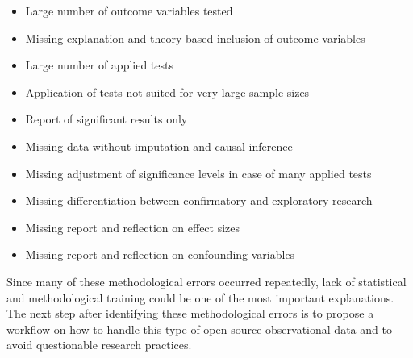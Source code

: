 \begin{itemize}
    \item Large number of outcome variables tested  \cite{bjorklund2022balancing,le2022visual,ortega2021effect,franchini2020tracking}
    \item Missing explanation and theory-based inclusion of outcome variables \cite{bjorklund2022balancing,le2022visual,koenigsberg2020generational,de2022relative}
    \item Large number of applied tests \cite{bjorklund2022balancing,le2022visual,ortega2021effect,koenigsberg2020generational,zart2022season,de2022relative,fuller2020ten,franchini2020tracking,nikolaidis2019russians}
    \item Application of tests not suited for very large sample sizes \cite{herold2022off,ortega2021effect,hackett2021effects,koenigsberg2020generational,mcintosh2021apples,de2022relative,jackson2020hill}
    \item Report of significant results only \cite{le2022visual,hackett2021effects,fuller2020ten,nikolaidis2019russians}
    \item Missing data without imputation and causal inference \cite{le2022visual,de2022relative}
    \item Missing adjustment of significance levels in case of many applied tests \cite{bjorklund2022balancing,herold2022off,le2022visual,ortega2021effect,hackett2021effects,koenigsberg2020generational,zart2022season,franchini2020tracking,jackson2020hill,nikolaidis2019russians}
    \item Missing differentiation between confirmatory and exploratory research \cite{bjorklund2022balancing,le2022visual,ortega2021effect,koenigsberg2020generational,de2022relative}
    \item Missing report and reflection on effect sizes \cite{bjorklund2022balancing,le2022visual,ortega2021effect,mcintosh2021apples,zart2022season,fuller2020ten,franchini2020tracking,nikolaidis2019russians}
    \item Missing report and reflection on confounding variables \cite{bjorklund2022balancing,herold2022off,le2022visual,ortega2021effect,mcintosh2021apples,zart2022season,nikolaidis2019russians}
\end{itemize}

Since many of these methodological errors occurred repeatedly, lack of statistical and methodological training could be one of the most important explanations. The next step after identifying these methodological errors is to propose a workflow on how to handle this type of open-source observational data and to avoid questionable research practices.

